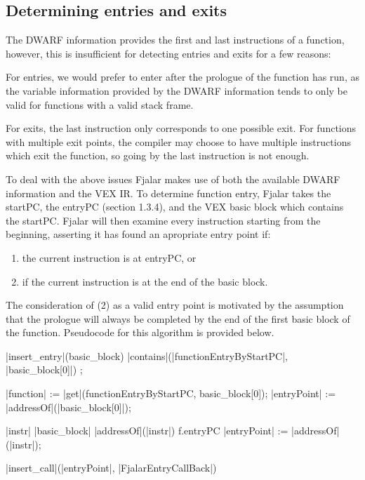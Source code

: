 \documentclass{article}
\begin{document}
\subsection{Determining entries and exits}
The DWARF information provides the first and last instructions of a
function, however, this is insufficient for detecting entries and
exits for a few reasons:

For entries, we would prefer to enter after the prologue of the
function has run, as the variable information provided by the DWARF
information tends to only be valid for functions with a valid stack frame.

For exits, the last instruction only corresponds to one possible
exit. For functions with multiple exit points, the compiler
may choose to have multiple instructions which exit the function, so
going by the last instruction is not enough. 

To deal with the above issues Fjalar makes use of both the available DWARF
information and the VEX IR. To determine function entry, Fjalar takes the
startPC, the entryPC (section 1.3.4), and the VEX basic block which
contains the startPC. Fjalar will then examine every instruction
starting from the beginning, asserting it has found an apropriate
entry point if: 

\begin{enumerate}
\item the current instruction is at entryPC, or 
\item if the current instruction is at the end of the basic block. 
\end{enumerate}

The consideration of (2) as a valid entry point is motivated by the
assumption that the prologue will always be completed by the end of
the first basic block of the function. Pseudocode for this algorithm
is provided below.

\begin{program}

\PROC |insert\_entry|(basic\_block) \BODY
  \IF \NOT |contains|(|functionEntryByStartPC|, |basic\_block[0]|) \THEN \EXIT \FI;

   |function| := |get|(functionEntryByStartPC, basic\_block[0]);
   |entryPoint| := |addressOf|(|basic\_block[0]|);

   \FOR |instr| \in |basic\_block| \DO
     \IF |addressOf|(|instr|) \leq f.entryPC \THEN \DO
       |entryPoint| := |addressOf|(|instr|);

   |insert\_call|(|entryPoint|, |FjalarEntryCallBack|)
   \EXIT
   \ENDPROC
 \end{program}
\end{document}
